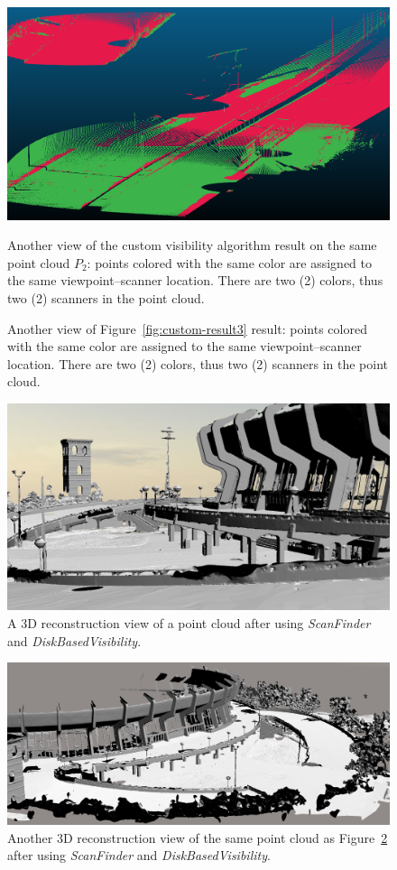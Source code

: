\begin{figure}
  \centering
  \includegraphics[scale=0.35]{img/custom-result4.png}
  \caption{Another view of the custom visibility algorithm result on the same point cloud $P_2$: points colored with the same color are assigned to the same viewpoint--scanner location. There are two (2) colors, thus two (2) scanners in the point cloud.}
  \caption{Another view of Figure~\ref{fig:custom-result3} result: points colored with the same color are assigned to the same viewpoint--scanner location. There are two (2) colors, thus two (2) scanners in the point cloud.}
  \label{fig:custom-result4}
\end{figure}
\begin{figure}
  \centering
  \includegraphics[scale=0.35]{img/complete-result1.png}
  \caption{A 3D reconstruction view of a point cloud after using \emph{ScanFinder} and \emph{DiskBasedVisibility}.}
  \label{fig:complete-result1}
\end{figure}
\begin{figure}
  \centering
  \includegraphics[scale=0.35]{img/complete-result2.png}
    \caption{Another 3D reconstruction view of the same point cloud as Figure~\ref{fig:complete-result1} after using \emph{ScanFinder} and \emph{DiskBasedVisibility}.}
  \label{fig:complete-result2}
\end{figure}

